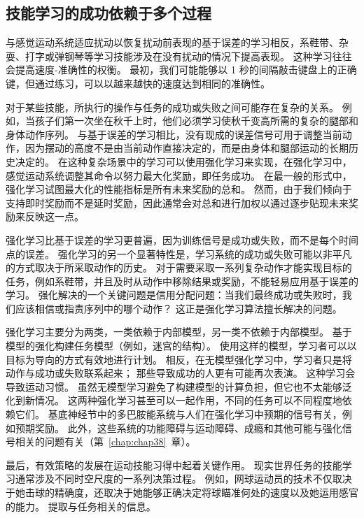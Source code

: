 \subsection{技能学习的成功依赖于多个过程}

与感觉运动系统适应扰动以恢复扰动前表现的基于误差的学习相反，系鞋带、杂耍、打字或弹钢琴等学习技能涉及在没有扰动的情况下提高表现。
这种学习往往会提高速度-准确性的权衡。
最初，我们可能能够以 1 秒的间隔敲击键盘上的正确键，但通过练习，可以以越来越快的速度达到相同的准确性。


对于某些技能，所执行的操作与任务的成功或失败之间可能存在复杂的关系。
例如，当孩子们第一次坐在秋千上时，他们必须学习使秋千变高所需的复杂的腿部和身体动作序列。
与基于误差的学习相比，没有现成的误差信号可用于调整当前动作，因为摆动的高度不是由当前动作直接决定的，而是由身体和腿部运动的长期历史决定的。
在这种复杂场景中的学习可以使用强化学习来实现，在强化学习中，感觉运动系统调整其命令以努力最大化奖励，即任务成功。
在最一般的形式中，强化学习试图最大化的性能指标是所有未来奖励的总和。
然而，由于我们倾向于支持即时奖励而不是延时奖励，因此通常会对总和进行加权以通过逐步贴现未来奖励来反映这一点。


强化学习比基于误差的学习更普遍，因为训练信号是成功或失败，而不是每个时间点的误差。
强化学习的另一个显著特性是，学习系统的成功或失败可能以非平凡的方式取决于所采取动作的历史。
对于需要采取一系列复杂动作才能实现目标的任务，例如系鞋带，并且及时从动作中移除结果或奖励，不能轻易应用基于误差的学习。
强化解决的一个关键问题是信用分配问题：当我们最终成功或失败时，我们应该相信或指责序列中的哪个动作？
这正是强化学习算法擅长解决的问题。


强化学习主要分为两类，一类依赖于内部模型，另一类不依赖于内部模型。
基于模型的强化构建任务模型（例如，迷宫的结构）。
使用这样的模型，学习者可以以目标为导向的方式有效地进行计划。
相反，在无模型强化学习中，学习者只是将动作与成功或失败联系起来；
那些导致成功的人更有可能再次表演。
这种学习会导致运动习惯。
虽然无模型学习避免了构建模型的计算负担，但它也不太能够泛化到新情况。
这两种强化学习甚至可以一起作用，不同的任务可以不同程度地依赖它们。
基底神经节中的多巴胺能系统与人们在强化学习中预期的信号有关，例如预期奖励。
此外，这些系统的功能障碍与运动障碍、成瘾和其他可能与强化信号相关的问题有关（第~\ref{chap:chap38}~章）。


最后，有效策略的发展在运动技能习得中起着关键作用。
现实世界任务的技能学习通常涉及不同时空尺度的一系列决策过程。
例如，网球运动员的技术不仅取决于她击球的精确度，还取决于她能够正确决定将球瞄准何处的速度以及她运用感官的能力。
提取与任务相关的信息。



